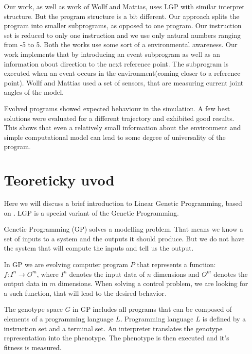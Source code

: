\documentclass{ExcelAtFIT}
\begin{document}
Our work, as well as work of Wollf and Mattias, uses LGP with similar interpret structure.
But the program structure is a bit different.
Our approach splits the program into smaller subprograms, as opposed to one program.
Our instruction set is reduced to only one instruction and we use only natural numbers ranging from -5 to 5.
Both the works use some sort of a environmental awareness.
Our work implements that by introducing an event subprogram as well as an information about direction to the next reference point.
The subprogram is executed when an event occurs in the environment(coming closer to a reference point).
Wollf and Mattias used a set of sensors, that are measuring current joint angles of the model.

Evolved programs showed expected behaviour in the simulation.
A few best solutions were evaluated for a different trajectory and exhibited good results.
This shows that even a relatively small information about the environment and simple computational model can lead to some degree of universality of the program.

\section{Teoreticky uvod}
\label{sec:theory}
Here we will discuss a brief introduction to Linear Genetic Programming, based on \cite{Brameier2010}.
LGP is a special variant of the Genetic Programming.

Genetic Programming (GP) solves a modelling problem.
That means we know a set of inputs to a system and the outputs it should produce.
But we do not have the system that will compute the inputs and tell us the output.

In GP we are evolving computer program $P$ that represents a function: $f : I^n \to O^m$, where $I^n$ denotes the input data of $n$ dimensions and $O^m$ denotes the output data in $m$ dimensions.
When solving a control problem, we are looking for a such function, that will lead to the desired behavior.

The genotype space $G$ in GP includes all programs that can be composed of elements of a programming language $L$.
Programming language $L$ is defined by a instruction set and a terminal set.
An interpreter translates the genotype representation into the phenotype.
The phenotype is then executed and it's fitness is measured.
\end{document}
